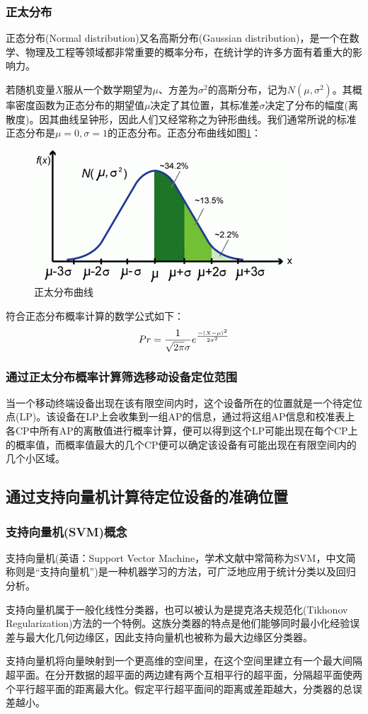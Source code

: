 \documentclass[UTF8, twocolumn ]{ctexart}
\begin{document}
\subsubsection{正太分布}
正态分布(Normal distribution)又名高斯分布(Gaussian distribution)，是一个在数学、物理及工程等领域都非常重要的概率分布，在统计学的许多方面有着重大的影响力。
\par
若随机变量$X$服从一个数学期望为$\mu$、方差为$\sigma^{2}$的高斯分布，记为$N(\mu,\sigma^{2})$。其概率密度函数为正态分布的期望值$\mu$决定了其位置，其标准差$\sigma$决定了分布的幅度(离散度)。因其曲线呈钟形，因此人们又经常称之为钟形曲线。我们通常所说的标准正态分布是$\mu=0,\sigma=1$的正态分布。正态分布曲线如图\ref{fig:no6}：
\begin{figure}[!ht]\centering
  \includegraphics[keepaspectratio, scale=0.7]{no6.png}
  \caption{正太分布曲线\label{fig:no6}} 
\end{figure}
\par
符合正态分布概率计算的数学公式如下：
\begin{equation}\centering
  Pr=\frac{1}{\sqrt{2\pi}\sigma}e^{\frac{-(X-\mu)^{2}}{2\sigma^{2}}}
\end{equation}
\subsubsection{通过正太分布概率计算筛选移动设备定位范围}
当一个移动终端设备出现在该有限空间内时，这个设备所在的位置就是一个待定位点(LP)。该设备在LP上会收集到一组AP的信息，通过将这组AP信息和校准表上各CP中所有AP的离散值进行概率计算，便可以得到这个LP可能出现在每个CP上的概率值，而概率值最大的几个CP便可以确定该设备有可能出现在有限空间内的几个小区域。

\subsection{通过支持向量机计算待定位设备的准确位置}
\subsubsection{支持向量机(SVM)概念}
支持向量机(英语：Support Vector Machine，学术文献中常简称为SVM，中文简称则是“支持向量机”)是一种机器学习的方法，可广泛地应用于统计分类以及回归分析。
\par
支持向量机属于一般化线性分类器，也可以被认为是提克洛夫规范化(Tikhonov Regularization)方法的一个特例。这族分类器的特点是他们能够同时最小化经验误差与最大化几何边缘区，因此支持向量机也被称为最大边缘区分类器。
\par
支持向量机将向量映射到一个更高维的空间里，在这个空间里建立有一个最大间隔超平面。在分开数据的超平面的两边建有两个互相平行的超平面，分隔超平面使两个平行超平面的距离最大化。假定平行超平面间的距离或差距越大，分类器的总误差越小。
\end{document}
